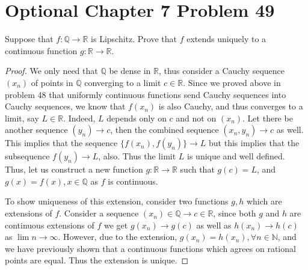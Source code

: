 \documentclass{article}
\newtheorem{proof}{Proof}
\def\to{\rightarrow}
\def\NN{\mathbb N}
\def\QQ{\mathbb Q}
\def\RR{\mathbb R}
\begin{document}
\section{Optional Chapter 7 Problem 49} Suppose that
$f:\QQ\to\RR$ is Lipschitz. Prove that $f$ extends uniquely
to a continuous function $g:\RR\to\RR$.
\begin{proof}
We only need that $\QQ$ be dense in $\RR$, thus consider a 
Cauchy sequence $(x_n)$
of points in $\QQ$ converging to a limit $c\in\RR$.
Since we proved above in problem 48 that uniformly continuous
functions send Cauchy sequences into Cauchy sequences, we know
that $f(x_n)$ is also Cauchy, and thus converges to a limit,
say $L\in\RR$. Indeed, $L$ depends only on $c$ and not on $(x_n)$.
Let there be another sequence $(y_n)\to c$, then the combined 
sequence $(x_n,y_n)\to c$ as well. This implies that the sequence
$\{f(x_n),f(y_n)\}\to L$
but this implies that the subsequence 
$f(y_n)\to L$, also. Thus the limit $L$
is unique and well defined. Thus, let us construct a new function
$g:\RR\to\RR$ such that $g(c)=L$, and $g(x)=f(x), x\in\QQ$ as $f$
is continuous.

To show uniqueness of this extension, consider two functions
$g,h$ which are extensions of $f$. Consider a
sequence $(x_n)\in\QQ\to c\in\RR$, since both $g$ and $h$
are continuous extensions of $f$ we get $g(x_n)\to g(c)$
as well as $h(x_n)\to h(c)$ as $\lim n\to\infty$. However, due
to the extension, $g(x_n)=h(x_n), \forall n\in\NN$, and we have
previously shown that a continuous functions which agrees on rational
points are equal. Thus the extension is unique.
\end{proof}
\end{document}
